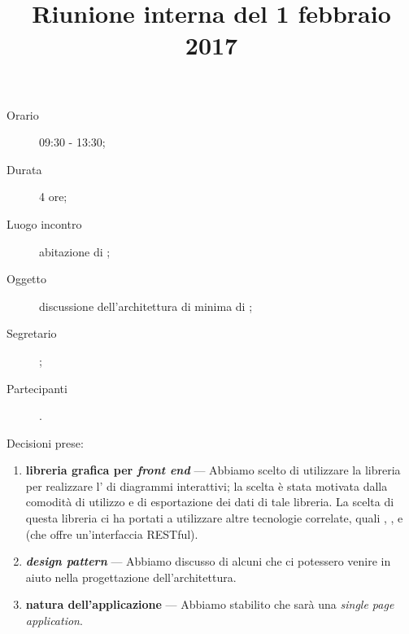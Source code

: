 


\author{\LS}
\supervisor{\LB}
\dest{\ALL}
\title{Riunione interna del 1 febbraio 2017}



\maketitle

\begin{description}
	\item[Orario] 09:30 - 13:30;
	\item[Durata] 4 ore;
	\item[Luogo incontro] abitazione di \LS;
	\item[Oggetto] discussione dell'architettura di minima di \proj;
	\item[Segretario] \LS;
	\item[Partecipanti] \ALL.
\end{description}

Decisioni prese:
\begin{enumerate}
	\item \textbf{libreria grafica per \emph{front end}} --- Abbiamo scelto di utilizzare la libreria \jointjs{} per realizzare l' di diagrammi interattivi; la scelta è stata motivata dalla comodità di utilizzo e di esportazione dei dati di tale libreria. La scelta di questa libreria ci ha portati a utilizzare altre tecnologie correlate, quali \html{}, \jquery{}, \lodash{} e \backbonejs{} (che offre un'interfaccia RESTful).
	\item \textbf{\emph{design pattern}} --- Abbiamo discusso di alcuni  che ci potessero venire in aiuto nella progettazione dell'architettura.
	\item \textbf{natura dell'applicazione} --- Abbiamo stabilito che \proj{} sarà una \emph{single page application}.
\end{enumerate}


